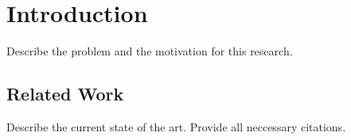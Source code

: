 \chapter{Introduction}\label{sec:introduction}

Describe the problem and the motivation for this research.

\section{Related Work}\label{sec:related_work}

Describe the current state of the art. Provide all neccessary citations.